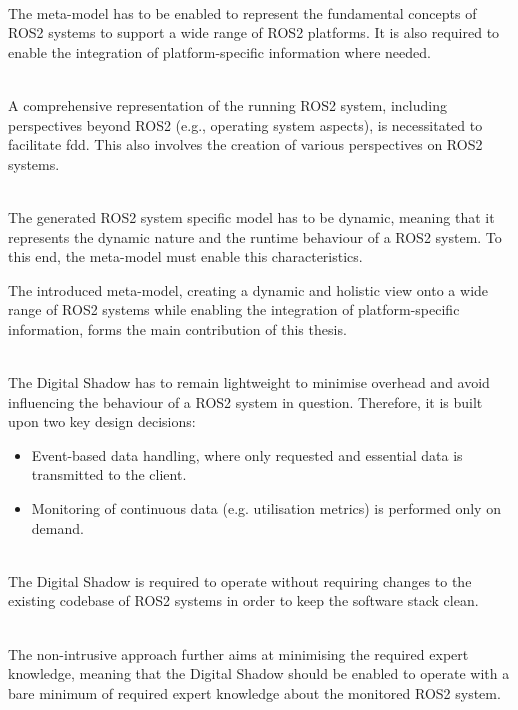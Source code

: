 \begin{description}[leftmargin=\descriptionIndent]
    \item[Generic Meta-Model for ROS2 Systems] \hfill \\
    The meta-model has to be enabled to represent the fundamental concepts of ROS2 systems to support a wide range of ROS2 platforms. It is also required to enable the integration of platform-specific information where needed.

    \item[Holistic Perspectives onto ROS2 Systems] \hfill \\
    A comprehensive representation of the running ROS2 system, including perspectives beyond ROS2 (e.g., operating system aspects), is necessitated to facilitate \acl{fdd}. This also involves the creation of various perspectives on ROS2 systems.

    \item[Runtime Representation] \hfill \\
    The generated ROS2 system specific model has to be dynamic, meaning that it represents the dynamic nature and the runtime behaviour of a ROS2 system. To this end, the meta-model must enable this characteristics.

    \hspace{-\descriptionIndent}\parbox{\textwidth}{The introduced meta-model, creating a dynamic and holistic view onto a wide range of ROS2 systems while enabling the integration of platform-specific information, forms the main contribution of this thesis.}

    \item[Lightweight Digital Shadow] \hfill \\
    The Digital Shadow has to remain lightweight to minimise overhead and avoid influencing the behaviour of a ROS2 system in question. Therefore, it is built upon two key design decisions:
        \begin{itemize}
            \item Event-based data handling, where only requested and essential data is transmitted to the client.
            \item Monitoring of continuous data (e.g. utilisation metrics) is performed only on demand.
        \end{itemize}

    \item[Non-Intrusiveness] \hfill \\
    The Digital Shadow is required to operate without requiring changes to the existing codebase of ROS2 systems in order to keep the software stack clean.
            
    \item[Minimising Expert Knowledge] \hfill \\
    The non-intrusive approach further aims at minimising the required expert knowledge, meaning that the Digital Shadow should be enabled to operate with a bare minimum of required expert knowledge about the monitored ROS2 system.
\end{description}

